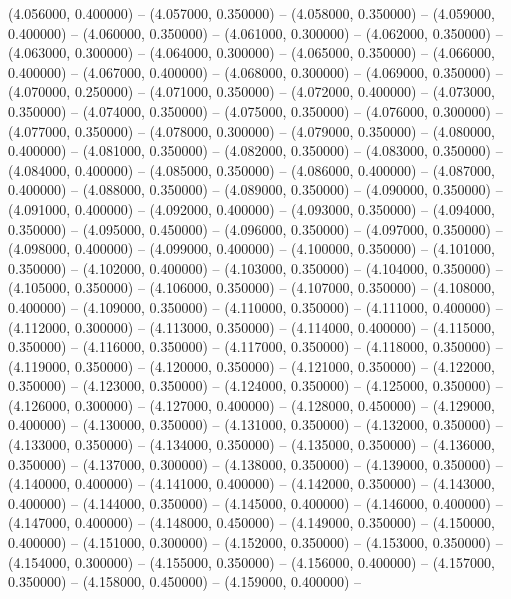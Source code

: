 (4.056000, 0.400000) -- 
(4.057000, 0.350000) -- 
(4.058000, 0.350000) -- 
(4.059000, 0.400000) -- 
(4.060000, 0.350000) -- 
(4.061000, 0.300000) -- 
(4.062000, 0.350000) -- 
(4.063000, 0.300000) -- 
(4.064000, 0.300000) -- 
(4.065000, 0.350000) -- 
(4.066000, 0.400000) -- 
(4.067000, 0.400000) -- 
(4.068000, 0.300000) -- 
(4.069000, 0.350000) -- 
(4.070000, 0.250000) -- 
(4.071000, 0.350000) -- 
(4.072000, 0.400000) -- 
(4.073000, 0.350000) -- 
(4.074000, 0.350000) -- 
(4.075000, 0.350000) -- 
(4.076000, 0.300000) -- 
(4.077000, 0.350000) -- 
(4.078000, 0.300000) -- 
(4.079000, 0.350000) -- 
(4.080000, 0.400000) -- 
(4.081000, 0.350000) -- 
(4.082000, 0.350000) -- 
(4.083000, 0.350000) -- 
(4.084000, 0.400000) -- 
(4.085000, 0.350000) -- 
(4.086000, 0.400000) -- 
(4.087000, 0.400000) -- 
(4.088000, 0.350000) -- 
(4.089000, 0.350000) -- 
(4.090000, 0.350000) -- 
(4.091000, 0.400000) -- 
(4.092000, 0.400000) -- 
(4.093000, 0.350000) -- 
(4.094000, 0.350000) -- 
(4.095000, 0.450000) -- 
(4.096000, 0.350000) -- 
(4.097000, 0.350000) -- 
(4.098000, 0.400000) -- 
(4.099000, 0.400000) -- 
(4.100000, 0.350000) -- 
(4.101000, 0.350000) -- 
(4.102000, 0.400000) -- 
(4.103000, 0.350000) -- 
(4.104000, 0.350000) -- 
(4.105000, 0.350000) -- 
(4.106000, 0.350000) -- 
(4.107000, 0.350000) -- 
(4.108000, 0.400000) -- 
(4.109000, 0.350000) -- 
(4.110000, 0.350000) -- 
(4.111000, 0.400000) -- 
(4.112000, 0.300000) -- 
(4.113000, 0.350000) -- 
(4.114000, 0.400000) -- 
(4.115000, 0.350000) -- 
(4.116000, 0.350000) -- 
(4.117000, 0.350000) -- 
(4.118000, 0.350000) -- 
(4.119000, 0.350000) -- 
(4.120000, 0.350000) -- 
(4.121000, 0.350000) -- 
(4.122000, 0.350000) -- 
(4.123000, 0.350000) -- 
(4.124000, 0.350000) -- 
(4.125000, 0.350000) -- 
(4.126000, 0.300000) -- 
(4.127000, 0.400000) -- 
(4.128000, 0.450000) -- 
(4.129000, 0.400000) -- 
(4.130000, 0.350000) -- 
(4.131000, 0.350000) -- 
(4.132000, 0.350000) -- 
(4.133000, 0.350000) -- 
(4.134000, 0.350000) -- 
(4.135000, 0.350000) -- 
(4.136000, 0.350000) -- 
(4.137000, 0.300000) -- 
(4.138000, 0.350000) -- 
(4.139000, 0.350000) -- 
(4.140000, 0.400000) -- 
(4.141000, 0.400000) -- 
(4.142000, 0.350000) -- 
(4.143000, 0.400000) -- 
(4.144000, 0.350000) -- 
(4.145000, 0.400000) -- 
(4.146000, 0.400000) -- 
(4.147000, 0.400000) -- 
(4.148000, 0.450000) -- 
(4.149000, 0.350000) -- 
(4.150000, 0.400000) -- 
(4.151000, 0.300000) -- 
(4.152000, 0.350000) -- 
(4.153000, 0.350000) -- 
(4.154000, 0.300000) -- 
(4.155000, 0.350000) -- 
(4.156000, 0.400000) -- 
(4.157000, 0.350000) -- 
(4.158000, 0.450000) -- 
(4.159000, 0.400000) -- 
